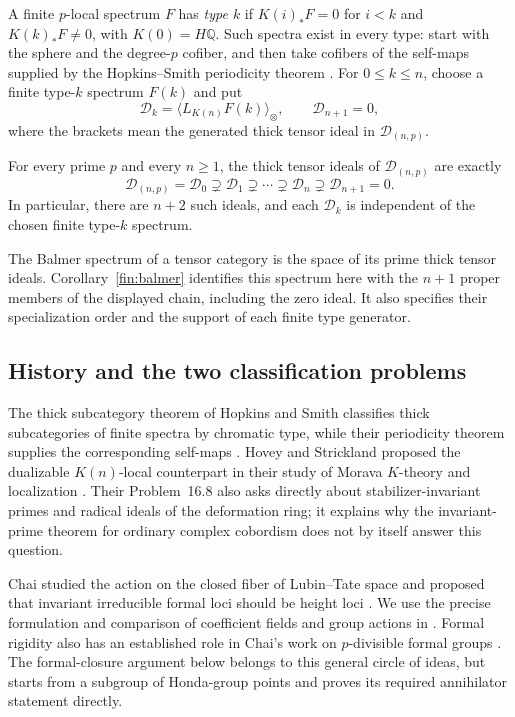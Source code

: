 A finite \(p\)-local spectrum \(F\) has \emph{type \(k\)} if
\(K(i)_*F=0\) for \(i<k\) and \(K(k)_*F\neq0\), with
\(K(0)=H\mathbb Q\).  Such spectra exist in every type: start with the
sphere and the degree-\(p\) cofiber, and then take cofibers of the
self-maps supplied by the Hopkins--Smith periodicity theorem
\cite[Definition~8 and Theorem~9]{HopkinsSmith98}.
For \(0\leq k\leq n\), choose a finite type-\(k\) spectrum \(F(k)\)
and put
\[
 \mathcal D_k=\big\langle L_{K(n)}F(k)\big\rangle_\otimes,
 \qquad \mathcal D_{n+1}=0,
\]
where the brackets mean the generated thick tensor ideal in
\(\mathcal D_{(n,p)}\).

\begin{theorem}\label{thm:main}
For every prime \(p\) and every \(n\geq 1\), the thick tensor ideals of
\(\mathcal D_{(n,p)}\) are exactly
\[
 \mathcal D_{(n,p)}=\mathcal D_0
 \supsetneq\mathcal D_1\supsetneq\cdots
 \supsetneq\mathcal D_n\supsetneq\mathcal D_{n+1}=0.
\]
In particular, there are \(n+2\) such ideals, and each \(\mathcal D_k\)
is independent of the chosen finite type-\(k\) spectrum.
\end{theorem}

The Balmer spectrum of a tensor category is the space of its prime thick
tensor ideals.  Corollary~\ref{fin:balmer} identifies this spectrum here
with the \(n+1\) proper members of the displayed chain, including the
zero ideal.  It also specifies their specialization order and the
support of each finite type generator.

\subsection{History and the two classification problems}

The thick subcategory theorem of Hopkins and Smith classifies thick
subcategories of finite spectra by chromatic type, while their
periodicity theorem supplies the corresponding self-maps
\cite[Theorems~7 and~9]{HopkinsSmith98}.  Hovey and Strickland proposed
the dualizable \(K(n)\)-local counterpart in their study of Morava
\(K\)-theory and localization \cite[Section~12, p.~61]{HS99}.
Their Problem~16.8 also asks directly about stabilizer-invariant primes
and radical ideals of the deformation ring; it explains why the
invariant-prime theorem for ordinary complex cobordism does not by
itself answer this question.

Chai studied the action on the closed fiber of Lubin--Tate space and
proposed that invariant irreducible formal loci should be height loci
\cite{Chai96}.  We use the precise formulation and comparison of
coefficient fields and group actions in
\cite[Section~4, Hope~4.1 and Remark~4.2]{BHN22}.
Formal rigidity also has an established role in Chai's work on
\(p\)-divisible formal groups \cite{Chai08}.  The formal-closure
argument below belongs to this general circle of ideas, but starts
from a subgroup of Honda-group points and proves its required
annihilator statement directly.

